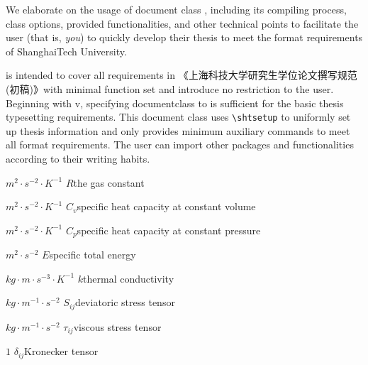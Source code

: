 \documentclass[bachelor, comfort]{shtthesis}
\makeatletter
\def\ifgraduate{\ifsht@graduate}
\makeatother
\begin{document}
\maketitle

\frontmatter
\begin{abstract}[flattitle]
  本文档阐述 \shtthesis{} 的使用方法，包括其编译方式、文档类选项、文档类提供的功能及其他便于用户（\emph{也就是正在阅读这篇文档的您}）快速撰写符合上海科技大学要求的学位论文的技术要点。

  \shtthesis{} 旨在以最简实现和最小依赖完整覆盖《上海科技大学研究生学位论文撰写规范（初稿）》的所有格式要求，且不为用户额外设限。从 v\version{} 起，仅需指定 documentclass 为 \shtthesis{} 即可满足基本排版要求。文档通过 \verb|\shtsetup| 命令统一设定学位论文信息，且仅提供满足格式需求的最少额外命令以保证兼容性。用户可根据自身撰文习惯，引入额外的宏包和命令完成学位论文撰写。
\end{abstract}

\begin{abstract*}[flattitle]
  We elaborate on the usage of document class \shtthesis{}, including its compiling process, class options, provided functionalities, and other technical points to facilitate the user (that is, \emph{you}) to quickly develop their thesis to meet the format requirements of ShanghaiTech University. 

  \shtthesis{} is intended to cover all requirements in 《上海科技大学研究生学位论文撰写规范(初稿)》with minimal function set and introduce no restriction to the user. Beginning with v\version{}, specifying documentclass to \shtthesis{} is suﬀicient for the basic thesis typesetting requirements. This document class uses \verb|\shtsetup| to uniformly set up thesis information and only provides minimum auxiliary commands to meet all format requirements. The user can import other packages and functionalities according to their writing habits. 
\end{abstract*}

\makeindices

\ifgraduate
\begin{nomenclatures}
  \item[${m^{2} \cdot s^{-2} \cdot K^{-1}}$]{$R$}{the gas constant}
  \item[${m^{2} \cdot s^{-2} \cdot K^{-1}}$]{$C_v$}{specific heat capacity at constant volume}
  \item[${m^{2} \cdot s^{-2} \cdot K^{-1}}$]{$C_p$}{specific heat capacity at constant pressure}
  \item[${m^{2} \cdot s^{-2}}$]{$E$}{specific total energy}
  \item[${kg \cdot m \cdot s^{-3} \cdot K^{-1}}$]{$k$}{thermal conductivity}
  \item[${kg \cdot m^{-1} \cdot s^{-2}}$]{$S_{ij}$}{deviatoric stress tensor}
  \item[${kg \cdot m^{-1} \cdot s^{-2}}$]{$\tau_{ij}$}{viscous stress tensor}
  \item[${1}$]{$\delta_{ij}$}{Kronecker tensor}
\end{nomenclatures}
\end{document}
